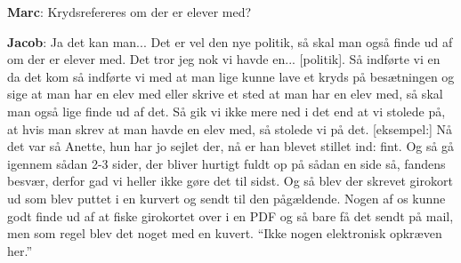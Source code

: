 \textbf{Marc}: Krydsrefereres om der er elever med? 

\textbf{Jacob}: Ja det kan man... Det er vel den nye politik, så skal man også finde ud af om der er elever med. Det tror jeg nok vi havde en... [politik]. Så indførte vi en da det kom så indførte vi med at man lige kunne lave et kryds på besætningen og sige at man har en elev med eller skrive et sted at man har en elev med, så skal man også lige finde ud af det. Så gik vi ikke mere ned i det end at vi stolede på, at hvis man skrev at man havde en elev med, så stolede vi på det. [eksempel:] Nå det var så Anette, hun har jo sejlet der, nå er han blevet stillet ind: fint. Og så gå igennem sådan 2-3 sider, der bliver hurtigt fuldt op på sådan en side så, fandens besvær, derfor gad vi heller ikke gøre det til sidst. 
Og så blev der skrevet girokort ud som blev puttet i en kurvert og sendt til den pågældende. Nogen af os kunne godt finde ud af at fiske girokortet over i en PDF og så bare få det sendt på mail, men som regel blev det noget med en kuvert. ``Ikke nogen elektronisk opkræven her.'' 

